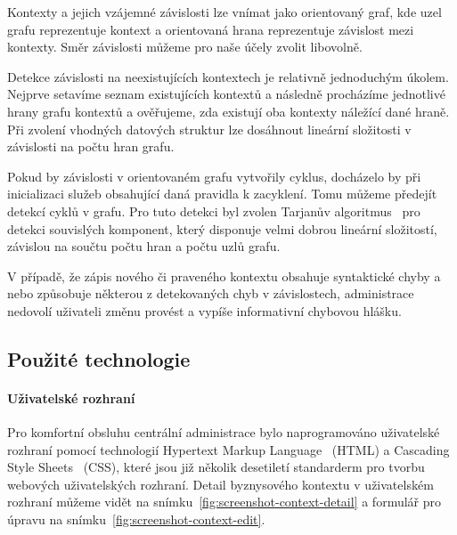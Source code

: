 Kontexty a jejich vzájemné závislosti lze vnímat jako
orientovaný graf, kde uzel grafu reprezentuje kontext
a orientovaná hrana reprezentuje závislost mezi kontexty.
Směr závislosti můžeme pro naše účely zvolit libovolně.

Detekce závislosti na neexistujících kontextech je relativně
jednoduchým úkolem. Nejprve setavíme seznam existujících kontextů
a následně procházíme jednotlivé hrany grafu kontextů a ověřujeme,
zda existují oba kontexty náležící dané hraně.
Při zvolení vhodných datových struktur lze dosáhnout
lineární složitosti v závislosti na počtu hran grafu.

Pokud by závislosti v orientovaném grafu vytvořily cyklus,
docházelo by při inicializaci služeb
obsahující daná pravidla k zacyklení. Tomu můžeme předejít
detekcí cyklů v grafu. Pro tuto detekci byl zvolen
Tarjanův algoritmus~\cite{tarjan1971depth} pro detekci souvislých
komponent, který disponuje velmi dobrou lineární složitostí,
závislou na součtu počtu hran a počtu uzlů grafu.

V případě, že zápis nového či praveného kontextu obsahuje syntaktické
chyby a nebo způsobuje některou z detekovaných chyb v závislostech,
administrace nedovolí uživateli změnu provést a vypíše informativní
chybovou hlášku.

\subsection{Použité technologie}

\paragraph{Uživatelské rozhraní}
Pro komfortní obsluhu centrální administrace bylo naprogramováno
uživatelské rozhraní pomocí technologií Hypertext Markup Language~\cite{berners1995hypertext}
(HTML) a Cascading Style Sheets~\cite{bos1998cascading} (CSS), které jsou již několik
desetiletí standarderm pro tvorbu webových uživatelských rozhraní.
Detail byznysového kontextu v uživatelském rozhraní můžeme vidět na snímku~\ref{fig:screenshot-context-detail}
a formulář pro úpravu na snímku~\ref{fig:screenshot-context-edit}.


